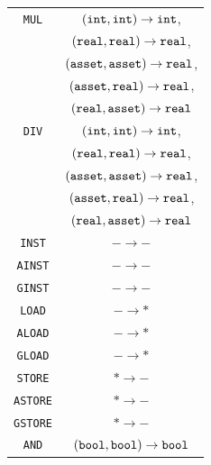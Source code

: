 \begin{ThreePartTable}
\begin{longtable}{|c|c|}
    \verb|MUL|      & $(\verb|int|, \verb|int|) \rightarrow \verb|int|$,      \\
                    & $(\verb|real|, \verb|real|) \rightarrow \verb|real|$,   \\
                    & $(\verb|asset|, \verb|asset|) \rightarrow \verb|real|$, \\
                    & $(\verb|asset|, \verb|real|) \rightarrow \verb|real|$,  \\
                    & $(\verb|real|, \verb|asset|) \rightarrow \verb|real|$   \\
    \hline
    
    \verb|DIV|      & $(\verb|int|, \verb|int|) \rightarrow \verb|int|$,      \\
                    & $(\verb|real|, \verb|real|) \rightarrow \verb|real|$,   \\
                    & $(\verb|asset|, \verb|asset|) \rightarrow \verb|real|$, \\
                    & $(\verb|asset|, \verb|real|) \rightarrow \verb|real|$,  \\
                    & $(\verb|real|, \verb|asset|) \rightarrow \verb|real|$   \\
    \hline
    
    \verb|INST|     & $- \rightarrow -$ \\
    \hline

    \verb|AINST|    & $- \rightarrow -$ \\
    \hline

    \verb|GINST|    & $- \rightarrow -$ \\
    \hline
    
    \verb|LOAD|     & $- \rightarrow *$ \\
    \hline

    \verb|ALOAD|    & $- \rightarrow *$ \\
    \hline

    \verb|GLOAD|    & $- \rightarrow *$ \\
    \hline
    
    \verb|STORE|    & $* \rightarrow -$ \\
    \hline

    \verb|ASTORE|   & $* \rightarrow -$ \\
    \hline

    \verb|GSTORE|   & $* \rightarrow -$ \\
    \hline
    
    \verb|AND|      & $(\verb|bool|, \verb|bool|) \rightarrow \verb|bool|$ \\
    \hline
    

\end{longtable}
\end{ThreePartTable}
